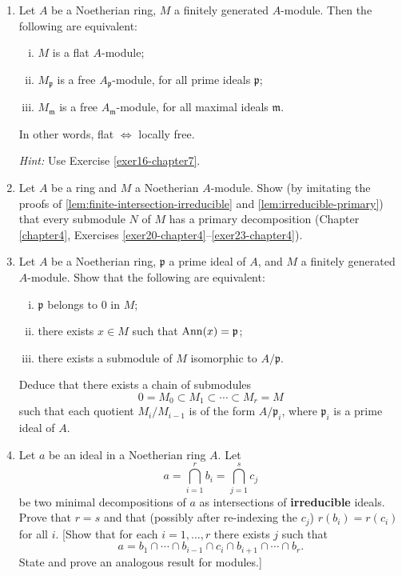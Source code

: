 \begin{enumerate}
    \item \label{exer16-chapter7}Let $A$ be a Noetherian ring, $M$ a finitely generated $A$-module. Then the following are equivalent:
    \begin{enumerate}[i)]
        \item $M$ is a flat $A$-module;
        \item $M_\mathfrak{p}$ is a free $A_\mathfrak{p}$-module, for all prime ideals $\mathfrak{p}$;
        \item $M_\mathfrak{m}$ is a free $A_\mathfrak{m}$-module, for all maximal ideals $\mathfrak{m}$.
    \end{enumerate}
    In other words, flat $\iff$ locally free.

    \textit{Hint:} Use Exercise \ref{exer16-chapter7}.

    \item \label{exer17-chapter7}Let $A$ be a ring and $M$ a Noetherian $A$-module. Show (by imitating the proofs of \eqref{lem:finite-intersection-irreducible} and \eqref{lem:irreducible-primary}) that every submodule $N$ of $M$ has a primary decomposition (Chapter \ref{chapter4}, Exercises \ref{exer20-chapter4}--\ref{exer23-chapter4}).

    \item \label{exer18-chapter7}Let $A$ be a Noetherian ring, $\mathfrak{p}$ a prime ideal of $A$, and $M$ a finitely generated $A$-module. Show that the following are equivalent:
    \begin{enumerate}[i)]
        \item $\mathfrak{p}$ belongs to $0$ in $M$;
        \item there exists $x \in M$ such that $\operatorname{Ann}(x) = \mathfrak{p}$;
        \item there exists a submodule of $M$ isomorphic to $A/\mathfrak{p}$.
    \end{enumerate}
    Deduce that there exists a chain of submodules
    \[
    0 = M_0 \subset M_1 \subset \cdots \subset M_r = M
    \]
    such that each quotient $M_i/M_{i-1}$ is of the form $A/\mathfrak{p}_i$, where $\mathfrak{p}_i$ is a prime ideal of $A$.

    \item \label{exer19-chapter7}Let $ a $ be an ideal in a Noetherian ring $ A $. Let
    \[
    a = \bigcap_{i=1}^r b_i = \bigcap_{j=1}^s c_j
    \]
    be two minimal decompositions of $ a $ as intersections of \textbf{irreducible} ideals. Prove that $ r = s $ and that (possibly after re-indexing the $ c_j $) $ r(b_i) = r(c_i) $ for all $ i $.  
    [Show that for each $ i = 1, \ldots, r $ there exists $ j $ such that
    \[
    a = b_1 \cap \cdots \cap b_{i-1} \cap c_i \cap b_{i+1} \cap \cdots \cap b_r.
    \]
    State and prove an analogous result for modules.]


\end{enumerate}
